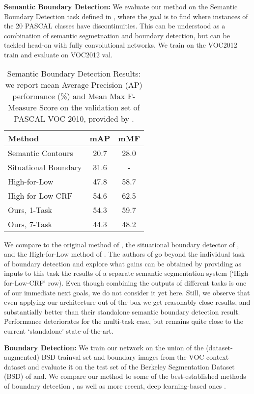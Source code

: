 \documentclass[10pt,twocolumn,letterpaper]{article}
\begin{document}
\textbf{Semantic Boundary Detection:}
 We evaluate our method on the Semantic Boundary Detection task defined in 
 \cite{hariharan2011semantic}, where the goal is to find where instances of the 20 PASCAL classes have discontinuities. This can be understood as a combination of semantic segmetnation and boundary detection, but can be tackled head-on with fully convolutional networks. 
 We train on the VOC2012 train and evaluate on VOC2012 val.
 
 \begin{table}[!h]
 	\begin{tabular}{|l|c|c|} \hline
 		Method			&  mAP & mMF 	 		
 		\\\hline	\hline
 		Semantic Contours \cite{hariharan2011semantic}  & 20.7		&   28.0  	\\\hline
 		Situational Boundary \cite{UijlingsF15} & 31.6 & -  \\\hline
 		High-for-Low \cite{BertasiusST15} 	&  47.8  &  58.7 \\\hline
 		High-for-Low-CRF \cite{BertasiusST15} & 54.6 & 62.5 \\\hline
 		Ours, 1-Task & 54.3 & 59.7 \\\hline
 		Ours, 7-Task & 44.3 & 48.2 \\\hline
 	\end{tabular}
 	\caption{Semantic Boundary Detection Results: we report mean Average Precision (AP) performance (\%) and  Mean Max F-Measure Score on the validation set of PASCAL VOC 2010, provided by \cite{hariharan2011semantic}.}
 	\label{table:results_ap}
 \end{table}
 
 We compare to the original method of \cite{hariharan2011semantic}, the situational boundary detector of \cite{UijlingsF15}, and the High-for-Low method of \cite{BertasiusST15}. The authors of \cite{BertasiusST15} go beyond the individual task of boundary detection and explore what gains can be obtained by providing as inputs to this task the results of a separate semantic segmentation system (`High-for-Low-CRF' row). Even though combining the outputs of different tasks is one of our immediate next goals, we do not consider it yet here. Still, we observe that even applying our architecture out-of-the-box we get reasonably close results, and substantially better than their standalone semantic boundary detection result. Performance deteriorates for the multi-task case, but remains quite close to the current `standalone' state-of-the-art. 
 
 
 \textbf{Boundary Detection:} We  train our network on the union of the (dataset-augmented) BSD trainval set and boundary images from the VOC context dataset \cite{context} and evaluate it on the test set of the Berkeley Segmentation Dataset (BSD)  of \cite{MFTM01} and. We compare our method to some of the best-established methods of boundary detection \cite{berkeley11,sfs}, as well as more recent, deep learning-based ones \cite{aistat,ganin2014n,shi15,iclrbnd,shen2015deepcontour,hed,iclr16}. 
 
\end{document}
